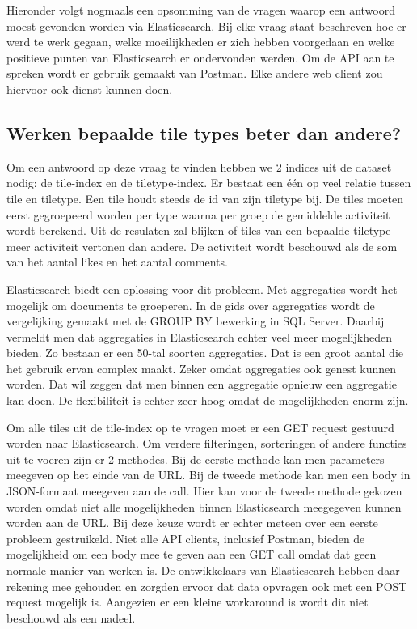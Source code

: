 Hieronder volgt nogmaals een opsomming van de vragen waarop een antwoord moest gevonden worden via Elasticsearch. Bij elke vraag staat beschreven hoe er werd te werk gegaan, welke moeilijkheden er zich hebben voorgedaan en welke positieve punten van Elasticsearch er ondervonden werden. Om de API aan te spreken wordt er gebruik gemaakt van Postman. Elke andere web client zou hiervoor ook dienst kunnen doen.

\subsection{Werken bepaalde tile types beter dan andere?}
Om een antwoord op deze vraag te vinden hebben we 2 indices uit de dataset nodig: de tile-index en de tiletype-index. Er bestaat een één op veel relatie tussen tile en tiletype. Een tile houdt steeds de id van zijn tiletype bij. De tiles moeten eerst gegroepeerd worden per type waarna per groep de gemiddelde activiteit wordt berekend. Uit de resulaten zal blijken of tiles van een bepaalde tiletype meer activiteit vertonen dan andere. De activiteit wordt beschouwd als de som van het aantal likes en het aantal comments.

Elasticsearch biedt een oplossing voor dit probleem. Met aggregaties wordt het mogelijk om documents te groeperen. In de gids over aggregaties wordt de vergelijking gemaakt met de GROUP BY bewerking in SQL Server. Daarbij vermeldt men dat aggregaties in Elasticsearch echter veel meer mogelijkheden bieden. Zo bestaan er een 50-tal soorten aggregaties. Dat is een groot aantal die het gebruik ervan complex maakt. Zeker omdat aggregaties ook genest kunnen worden. Dat wil zeggen dat men binnen een aggregatie opnieuw een aggregatie kan doen. De flexibiliteit is echter zeer hoog omdat de mogelijkheden enorm zijn.

Om alle tiles uit de tile-index op te vragen moet er een GET request gestuurd worden naar Elasticsearch. Om verdere filteringen, sorteringen of andere functies uit te voeren zijn er 2 methodes. Bij de eerste methode kan men parameters meegeven op het einde van de URL. Bij de tweede methode kan men een body in JSON-formaat meegeven aan de call. Hier kan voor de tweede methode gekozen worden omdat niet alle mogelijkheden binnen Elasticsearch meegegeven kunnen worden aan de URL. Bij deze keuze wordt er echter meteen over een eerste probleem gestruikeld. Niet alle API clients, inclusief Postman, bieden de mogelijkheid om een body mee te geven aan een GET call omdat dat geen normale manier van werken is. De ontwikkelaars van Elasticsearch hebben daar rekening mee gehouden en zorgden ervoor dat data opvragen ook met een POST request mogelijk is. Aangezien er een kleine workaround is wordt dit niet beschouwd als een nadeel.

